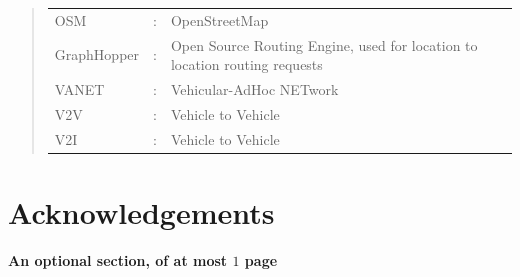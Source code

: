 \documentclass[ %
                    author={Alexander Hill},
                supervisor={Dr. Benjamin Sach},
                    degree={MEng},
                     title={MARMOSET},
                  subtitle={Multi-Agent Route Management using Online Simulation for Efficient Transportation},
                      type={research},
                      year={2016} ]{dissertation}
\begin{document}

\begin{quote}
\noindent
\begin{tabular}{lcl}
OSM                 &:     & OpenStreetMap \\
GraphHopper         &:     & Open Source Routing Engine, used for location to
    location routing requests \\
VANET               &:     & Vehicular-AdHoc NETwork \\
V2V                 &:     & Vehicle to Vehicle \\
V2I                 &:     & Vehicle to Vehicle \\
\end{tabular}
\end{quote}


\chapter*{Acknowledgements}

{\bf An optional section, of at most $1$ page}
\vspace{1cm}




%
\end{document}
